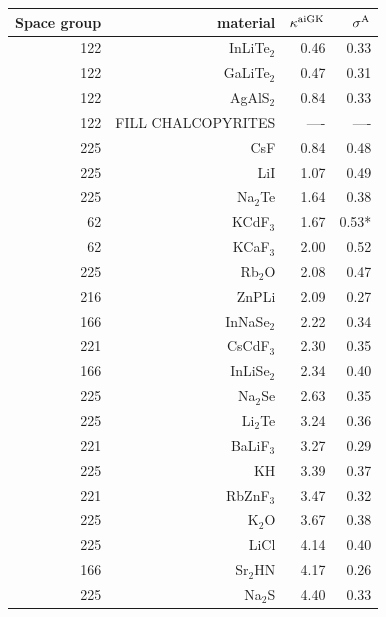 \begin{table}[ht]
  \centering
  \selectfont
\begin{tabular}{rrrr}
\toprule
Space group  &    material & $\kappa^{\rm aiGK}$ & $\sigma^\mathrm{A}$  \\
\midrule
         122 &  InLiTe$_2$ &                0.46 &       0.33 \\
         122 &  GaLiTe$_2$ &                0.47 &       0.31 \\
         122 &   AgAlS$_2$ &                0.84 &       0.33 \\
         122 &   FILL CHALCOPYRITES &       ---- &       ---- \\
         225 &         CsF &                0.84 &       0.48 \\
         225 &         LiI &                1.07 &       0.49 \\
         225 &    Na$_2$Te &                1.64 &       0.38 \\
          62 &    KCdF$_3$ &                1.67 &       0.53* \\
          62 &    KCaF$_3$ &                2.00 &       0.52 \\
         225 &     Rb$_2$O &                2.08 &       0.47 \\
         216 &       ZnPLi &                2.09 &       0.27 \\
         166 &  InNaSe$_2$ &                2.22 &       0.34 \\
         221 &   CsCdF$_3$ &                2.30 &       0.35 \\
         166 &  InLiSe$_2$ &                2.34 &       0.40 \\
         225 &    Na$_2$Se &                2.63 &       0.35 \\
         225 &    Li$_2$Te &                3.24 &       0.36 \\
         221 &   BaLiF$_3$ &                3.27 &       0.29 \\
         225 &          KH &                3.39 &       0.37 \\
         221 &   RbZnF$_3$ &                3.47 &       0.32 \\
         225 &      K$_2$O &                3.67 &       0.38 \\
         225 &        LiCl &                4.14 &       0.40 \\
         166 &    Sr$_2$HN &                4.17 &       0.26 \\
         225 &     Na$_2$S &                4.40 &       0.33 \\

\end{tabular}
\end{table}
